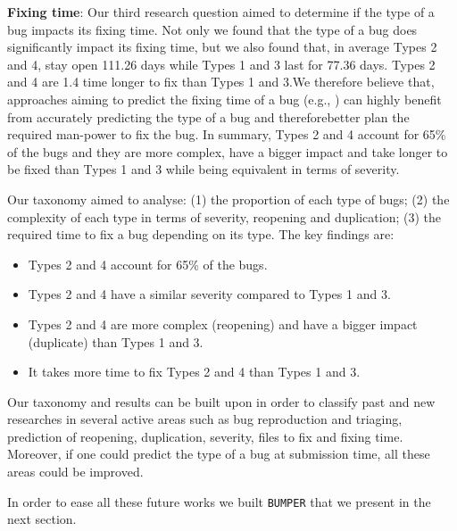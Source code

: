 {\bf Fixing time}: Our third research question aimed to determine
if the type of a bug impacts its fixing time. Not only we found
that the type of a bug does significantly impact its fixing time,
but we also found that, in average Types 2 and 4, stay open
111.26 days while Types 1 and 3 last for 77.36 days. Types 2
and 4 are 1.4 time longer to fix than Types 1 and 3.We
therefore believe that, approaches aiming to predict the fixing
time of a bug (e.g., \cite{Panjer2007,Bhattacharya2011,Zhang2013}) can highly benefit from
accurately predicting the type of a bug and thereforebetter
plan the required man-power to fix the bug.
In summary, Types 2 and 4 account for 65\% of the bugs
and they are more complex, have a bigger impact and take
longer to be fixed than Types 1 and 3 while being equivalent
in terms of severity.

Our taxonomy aimed to analyse: (1) the
proportion of each type of bugs; (2) the complexity of each
type in terms of severity, reopening and duplication; (3) the
required time to fix a bug depending on its type. The key
findings are:
\begin{itemize}
  \item Types 2 and 4 account for 65\% of the bugs.
  \item Types 2 and 4 have a similar severity compared to
Types 1 and 3.
  \item Types 2 and 4 are more complex (reopening) and have
a bigger impact (duplicate) than Types 1 and 3.
  \item It takes more time to fix Types 2 and 4 than Types 1
and 3.
\end{itemize}

Our taxonomy and results can be built upon in order to classify
past and new researches in several active areas such as bug
reproduction and triaging, prediction of reopening,
duplication, severity, files to fix and fixing time. Moreover, if
one could predict the type of a bug at submission time, all
these areas could be improved.

In order to ease all these future works we built {\tt BUMPER} that we present in the next section.

